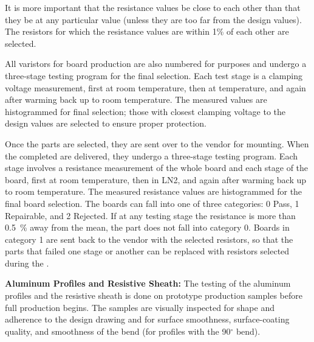 It is more important that the resistance values be close to each other than that they be at any particular value (unless they are too far from the design values). The resistors for which the resistance values are within 1\%  of each other are selected.%

All varistors for board production are also numbered for  purposes and undergo a three-stage  
testing program for the final selection. Each test stage is a clamping voltage measurement, first at room temperature, then at \lntwo temperature, and again after warming back up to room temperature. The measured values are histogrammed for final selection; those with closest clamping voltage to the design values are selected to ensure proper protection.

Once the parts are selected, they are sent over to the vendor for mounting.  When the completed  are delivered, they undergo a three-stage  testing program. Each stage involves a resistance measurement of the whole board and each stage of the board, first at room temperature, then in LN2, and again after warming back up to room temperature.  The measured resistance values are histogrammed for the final board selection. 
The boards can fall into one of three categories: 0 Pass, 1 Repairable, and 2 Rejected. 
If at any testing stage the resistance is more than \SI{0.5}{\%} away from the mean, the part does not fall into category 0. %
Boards in category 1 are sent back to the vendor with the selected resistors, so that the parts that failed one stage or another can be replaced with resistors selected during the . 

{\bf Aluminum Profiles and Resistive Sheath:}
The  testing of the aluminum profiles and the resistive sheath is done on prototype production samples before full production begins.   The samples are visually inspected for shape and adherence to the design drawing and for surface smoothness, surface-coating quality, and smoothness of the bend (for profiles with the \num{90}$^{\circ}$ bend).  

